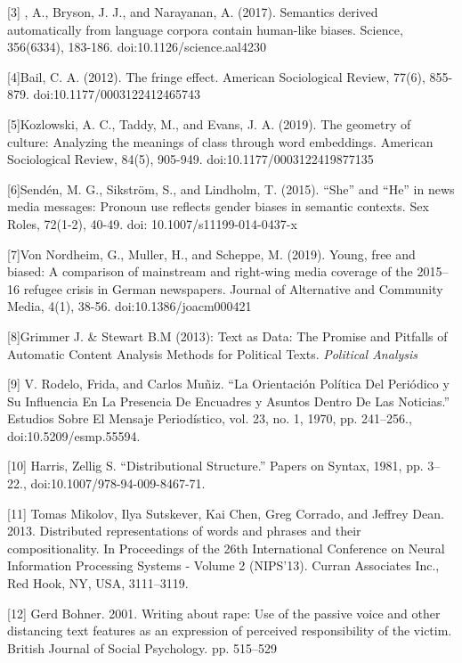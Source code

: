 \documentclass{article}
\begin{document}
[3] , A., Bryson, J. J., and Narayanan, A. (2017). Semantics derived automatically from language corpora contain human-like biases. Science, 356(6334), 183-186. doi:10.1126/science.aal4230

[4]Bail, C. A. (2012). The fringe effect. American Sociological Review, 77(6), 855-879. doi:10.1177/0003122412465743

[5]Kozlowski, A. C., Taddy, M., and Evans, J. A. (2019). The geometry of culture: Analyzing the meanings of class through word embeddings. American Sociological Review, 84(5), 905-949. doi:10.1177/0003122419877135

[6]Sendén, M. G., Sikström, S., and Lindholm, T. (2015). “She” and “He” in news media messages: Pronoun use reflects gender biases in semantic contexts. Sex Roles, 72(1-2), 40-49. doi: 10.1007/s11199-014-0437-x

[7]Von Nordheim, G., Muller, H., and Scheppe, M. (2019). Young, free and biased: A comparison of mainstream and right-wing media coverage of the 2015–16 refugee crisis in German newspapers. Journal of Alternative and Community Media, 4(1), 38-56. doi:10.1386/joacm000421
 
[8]Grimmer J. \& Stewart B.M (2013): Text as Data: The Promise and Pitfalls of Automatic Content Analysis Methods for Political Texts. 
{\it Political Analysis}

[9] V. Rodelo, Frida, and Carlos Muñiz. “La Orientación Política Del Periódico y Su Influencia En La Presencia De Encuadres y Asuntos Dentro De Las Noticias.” Estudios Sobre El Mensaje Periodístico, vol. 23, no. 1, 1970, pp. 241–256., doi:10.5209/esmp.55594. 

[10] Harris, Zellig S. “Distributional Structure.” Papers on Syntax, 1981, pp. 3–22., doi:10.1007/978-94-009-8467-71. 

[11] Tomas Mikolov, Ilya Sutskever, Kai Chen, Greg Corrado, and Jeffrey Dean. 2013. Distributed representations of words and phrases and their compositionality. In Proceedings of the 26th International Conference on Neural Information Processing Systems - Volume 2 (NIPS'13). Curran Associates Inc., Red Hook, NY, USA, 3111–3119.

[12] Gerd Bohner. 2001. Writing about rape: Use of the passive voice and other distancing text features as an expression of perceived responsibility of the victim. British Journal of Social Psychology. pp. 515–529 
\newpage
\pagebreak
\end{document}
